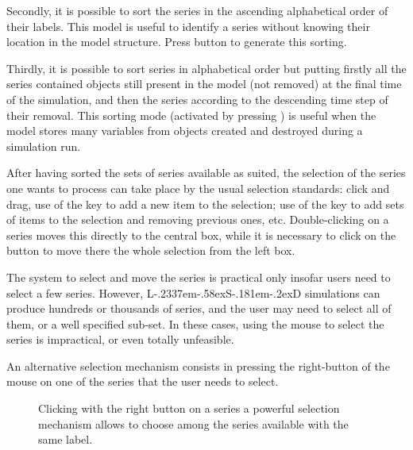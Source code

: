 \documentclass [11pt,a4paper] {book}
\def\LsD{{L\kern-.2337em\lower-.58ex\hbox{S}\kern-.181em\lower-.2ex\hbox{D}}\xspace}
\begin{document}
Secondly, it is possible to sort the series in the ascending alphabetical order of their labels. This model is useful to identify a series without knowing their location in the model structure. Press button  to generate this sorting.

Thirdly, it is possible to sort series in alphabetical order but putting firstly all the series contained objects still present in the model (not removed) at the final time of the simulation, and then the series according to the descending time step of their removal. This sorting mode (activated by pressing ) is useful when the model stores many variables from objects created and destroyed during a simulation run.

After having sorted the sets of series available as suited, the selection of the series one wants to process can take place by the usual selection standards: click and drag, use of the  key to add a new item to the selection; use of the key  to add sets of items to the selection and removing previous ones, etc. Double-clicking on a series moves this directly to the central box, while it is necessary to click on the button \menu{$>$} to move there the whole selection from the left box.


The system to select and move the series is practical only insofar users need to select a few series. However, \LsD simulations can produce hundreds or thousands of series, and the user may need to select all of them, or a well specified sub-set. In these cases, using the mouse to select the series is impractical, or even totally unfeasible.

An alternative selection mechanism consists in pressing the right-button of the mouse on one of the series that the user needs to select.


\begin{figure}[ht]
  \centering
  \caption{\small Clicking with the right button on a series a powerful selection mechanism allows to choose among the series available with the same label.}
  \label{fig:sselection}
\end{figure}
\end{document}
